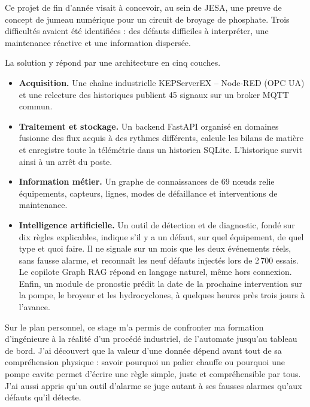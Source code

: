 
Ce projet de fin d'année visait à concevoir, au sein de JESA, une preuve de concept de jumeau numérique pour un circuit de broyage de phosphate. Trois difficultés avaient été identifiées : des défauts difficiles à interpréter, une maintenance réactive et une information dispersée.

La solution y répond par une architecture en cinq couches.
\begin{itemize}
  \item \textbf{Acquisition.} Une chaîne industrielle KEPServerEX -- Node-RED (OPC UA) et une relecture des historiques publient 45 signaux sur un broker MQTT commun.
  \item \textbf{Traitement et stockage.} Un backend FastAPI organisé en domaines fusionne des flux acquis à des rythmes différents, calcule les bilans de matière et enregistre toute la télémétrie dans un historien SQLite. L'historique survit ainsi à un arrêt du poste.
  \item \textbf{Information métier.} Un graphe de connaissances de 69 nœuds relie équipements, capteurs, lignes, modes de défaillance et interventions de maintenance.
  \item \textbf{Intelligence artificielle.} Un outil de détection et de diagnostic, fondé sur dix règles explicables, indique s'il y a un défaut, sur quel équipement, de quel type et quoi faire. Il ne signale sur un mois que les deux événements réels, sans fausse alarme, et reconnaît les neuf défauts injectés lors de 2\,700 essais. Le copilote Graph RAG répond en langage naturel, même hors connexion. Enfin, un module de pronostic prédit la date de la prochaine intervention sur la pompe, le broyeur et les hydrocyclones, à quelques heures près trois jours à l'avance.
\end{itemize}

Sur le plan personnel, ce stage m'a permis de confronter ma formation d'ingénieure à la réalité d'un procédé industriel, de l'automate jusqu'au tableau de bord. J'ai découvert que la valeur d'une donnée dépend avant tout de sa compréhension physique : savoir pourquoi un palier chauffe ou pourquoi une pompe cavite permet d'écrire une règle simple, juste et compréhensible par tous. J'ai aussi appris qu'un outil d'alarme se juge autant à ses fausses alarmes qu'aux défauts qu'il détecte.


